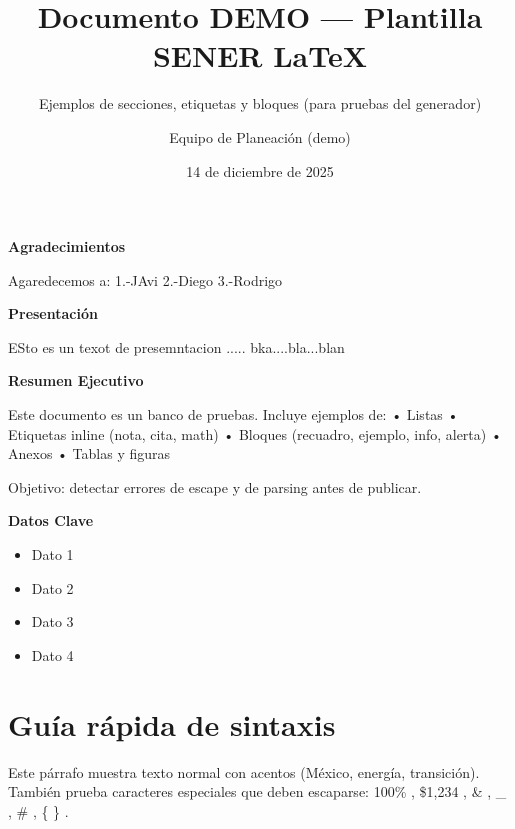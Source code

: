 \documentclass{sener2025}
\title{Documento DEMO — Plantilla SENER LaTeX}
\subtitle{Ejemplos de secciones, etiquetas y bloques (para pruebas del generador)}
\author{Equipo de Planeación (demo)}
\date{14 de diciembre de 2025}
\begin{document}

\tableofcontents
\newpage

\listafiguras
\newpage

\listatablas
\newpage

\clearpage
\begin{center}
{\Large\patriafont\bfseries\color{gobmxGuinda}Agradecimientos}\\[1cm]
\end{center}

Agaredecemos a:
1.-JAvi
2.-Diego
3.-Rodrigo

\clearpage
\begin{center}
{\Large\patriafont\bfseries\color{gobmxGuinda}Presentación}\\[1cm]
\end{center}

ESto es un texot de presemntacion ..... bka....bla...blan

\clearpage
\begin{center}
{\Large\patriafont\bfseries\color{gobmxGuinda}Resumen Ejecutivo}\\[1cm]
\end{center}

Este documento es un banco de pruebas. Incluye ejemplos de:
• Listas
• Etiquetas inline (nota, cita, math)
• Bloques (recuadro, ejemplo, info, alerta)
• Anexos
• Tablas y figuras

Objetivo: detectar errores de escape y de parsing antes de publicar.

\clearpage
\begin{center}
{\Large\patriafont\bfseries\color{gobmxGuinda}Datos Clave}\\[1cm]
\end{center}

\begin{itemize}
  \item Dato 1
  \item Dato 2
  \item Dato 3
  \item Dato 4
\end{itemize}


\section{Guía rápida de sintaxis}

Este párrafo muestra texto normal con acentos (México, energía, transición).
También prueba caracteres especiales que deben escaparse: 100\% , \$1,234 , \& , \_ , \# , \{ \} .
\end{document}
